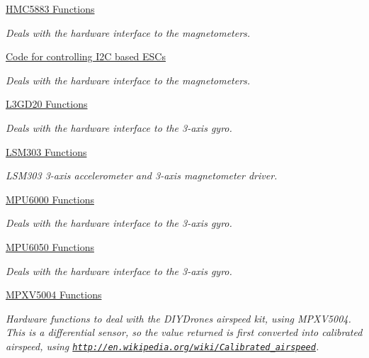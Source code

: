 \begin{DoxyCompactItemize}
\hyperlink{group___p_i_o_s___h_m_c5883}{H\-M\-C5883 Functions}
\begin{DoxyCompactList}\small\item\em Deals with the hardware interface to the magnetometers. \end{DoxyCompactList}\item 
\hyperlink{group___p_i_o_s___i2_c___e_s_c}{Code for controlling I2\-C based E\-S\-Cs}
\begin{DoxyCompactList}\small\item\em Deals with the hardware interface to the magnetometers. \end{DoxyCompactList}\item 
\hyperlink{group___p_i_o_s___l3_g_d20}{L3\-G\-D20 Functions}
\begin{DoxyCompactList}\small\item\em Deals with the hardware interface to the 3-\/axis gyro. \end{DoxyCompactList}\item 
\hyperlink{group___p_i_o_s___l_s_m303}{L\-S\-M303 Functions}
\begin{DoxyCompactList}\small\item\em L\-S\-M303 3-\/axis accelerometer and 3-\/axis magnetometer driver. \end{DoxyCompactList}\item 
\hyperlink{group___p_i_o_s___m_p_u6000}{M\-P\-U6000 Functions}
\begin{DoxyCompactList}\small\item\em Deals with the hardware interface to the 3-\/axis gyro. \end{DoxyCompactList}\item 
\hyperlink{group___p_i_o_s___m_p_u6050}{M\-P\-U6050 Functions}
\begin{DoxyCompactList}\small\item\em Deals with the hardware interface to the 3-\/axis gyro. \end{DoxyCompactList}\item 
\hyperlink{group___p_i_o_s___m_p_x_v5004}{M\-P\-X\-V5004 Functions}
\begin{DoxyCompactList}\small\item\em Hardware functions to deal with the D\-I\-Y\-Drones airspeed kit, using M\-P\-X\-V5004. This is a differential sensor, so the value returned is first converted into calibrated airspeed, using \href{http://en.wikipedia.org/wiki/Calibrated_airspeed}{\tt http\-://en.\-wikipedia.\-org/wiki/\-Calibrated\-\_\-airspeed}. \end{DoxyCompactList}\item 

\end{DoxyCompactItemize}
